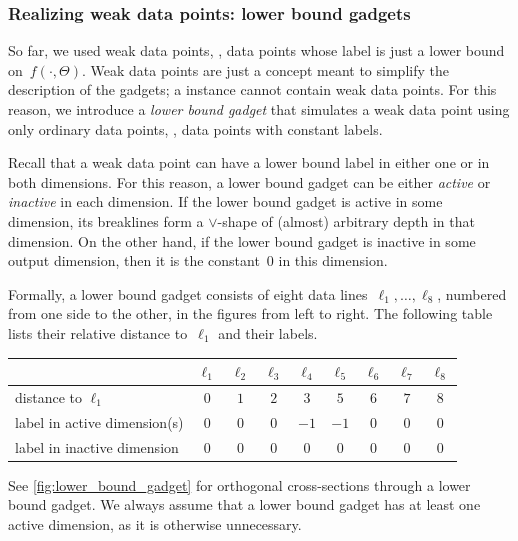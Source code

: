 \subsubsection{Realizing weak data points: lower bound gadgets}
\label{sec:lower_bound_gadget}

So far, we used weak data points, \ie, data points whose label is just a lower bound on~$f(\cdot, \Theta)$.
Weak data points are just a concept meant to simplify the description of the gadgets; a \trainNN instance cannot contain weak data points.
For this reason, we introduce a \emph{lower bound gadget} that simulates a weak data point using only ordinary data points, \ie, data points with constant labels.

Recall that a weak data point can have a lower bound label in either one or in both dimensions.
For this reason, a lower bound gadget can be either \emph{active} or \emph{inactive} in each dimension.
If the lower bound gadget is active in some dimension, its breaklines form a $\vee$-shape of (almost) arbitrary depth in that dimension.
On the other hand, if the lower bound gadget is inactive in some output dimension, then it is
%
the constant~$0$  %
in this dimension.

Formally, a lower bound gadget consists of eight data lines~$\ell_1, \ldots, \ell_8$, numbered from one side to the other, in the figures from left to right.
The following table lists their relative distance to~$\ell_1$ and their labels.

\begin{center}
    \begin{tabular}{lcccccccc}
        \toprule
        & $\ell_1$ & $\ell_2$ & $\ell_3$ & $\ell_4$ & $\ell_5$ & $\ell_6$ & $\ell_7$ & $\ell_8$ \\
        \midrule
        distance to $\ell_1$ & $0$ & $1$ & $2$ & $3$ & $5$ & $6$ & $7$ & $8$ \\
        label in active dimension(s) & $0$ & $0$ & $0$ & $-1$ & $-1$ & $0$ & $0$ & $0$ \\
        label in inactive dimension & $0$ & $0$ & $0$ & $0$ & $0$ & $0$ & $0$ & $0$ \\
        \bottomrule
    \end{tabular}
\end{center}
See \cref{fig:lower_bound_gadget} for orthogonal cross-sections through a lower bound gadget.
We always assume that a lower bound gadget has at least one active dimension, as it is otherwise unnecessary.

